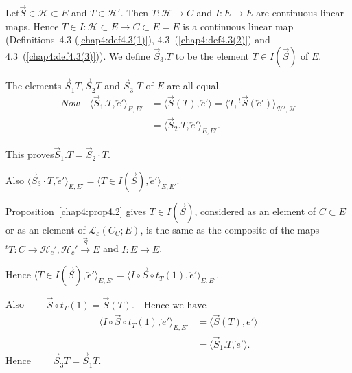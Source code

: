 \begin{definition}\label{chap6:def6.3}
Let\pageoriginale $\overrightarrow{S} \in \mathscr{H} \subset E$ and $T \in
\mathscr{H}'$. Then $T : \mathscr{H} \to C$ and $I : E \to E$ are
continuous linear maps. Hence $T \in I : \mathscr{H}
\subset E \to C \subset E = E$ is a continuous linear map
(Definitions~4.3 (\ref{chap4:def4.3(1)}), 4.3~(\ref{chap4:def4.3(2)}) and
4.3~(\ref{chap4:def4.3(3)})). We define
$\overrightarrow{S}_3. T$ to be the element $T \in I
(\overrightarrow{S})$ of $E$. 
\end{definition}

\setcounter{section}{6}
\setcounter{prop}{0}
\begin{prop}\label{chap6:prop6.1}
The elements $\overrightarrow{S}_{\dot{1}} T, \overrightarrow{S}_{\dot{2}} 
T$ and $\overrightarrow{S}_{\dot{3}}$ $T$ of $E$ are all equal.
\begin{align*}
Now \quad \langle \overrightarrow{S}_1. T, \overleftarrow{e}' \rangle _{E,
  E'} &= \langle \overrightarrow{S} (T), \overleftarrow{e}' \rangle =
\langle T, {}^t \overrightarrow{S}
(\overleftarrow{e}')\rangle_{\mathscr{H}',\mathscr{H}}\\
&= \langle \overrightarrow{S}_2. T, \overleftarrow{e}' \rangle_{E, E'}.
\end{align*}
\end{prop}

\noindent 
This proves\quad $\overrightarrow{S}_1. T=\overrightarrow{S}_2\cdot T$.

 \noindent Also \quad $\langle \overrightarrow{S}_3\cdot T,
\overleftarrow{e}'\rangle_{E, E'}= \langle T \in I
(\overrightarrow{S}), \overleftarrow{e}' \rangle_{E, E'}.$

\noindent Proposition~\ref{chap4:prop4.2} gives $T \in I
(\overrightarrow{S})$, considered as an element of $C \subset E$
or as an element of $\mathscr{L}_\varepsilon (C_C; E)$, is the same as
the composite of the maps ${}^t T : C \to \mathscr{H}_c',
\mathscr{H}_c'\xrightarrow{\overrightarrow{S}} E$ and $I : E \to E$.

\noindent Hence $\langle T \in I (\overrightarrow{S}),
\overleftarrow{e}' \rangle_{E, E'} = \langle I \circ
\overrightarrow{S} \circ t_T(1), \overleftarrow{e}' \rangle_{E, E'}$.

\noindent  Also $\qquad\overrightarrow{S} \circ t_T(1) =
\overrightarrow{S}(T). \quad \text{Hence we have}$
\begin{align*}
\langle I \circ \overrightarrow{S} \circ t_T (1),
\overleftarrow{e}'\rangle_{E, E'} &= \langle \overrightarrow{S} (T),
\overleftarrow{e}' \rangle\\
&= \langle \overrightarrow{S}_1. T, \overleftarrow{e}' \rangle.
\end{align*}
Hence $\qquad\overrightarrow{S}_{\dot{3}} T =
\overrightarrow{S}_{\dot{1}} T.$

